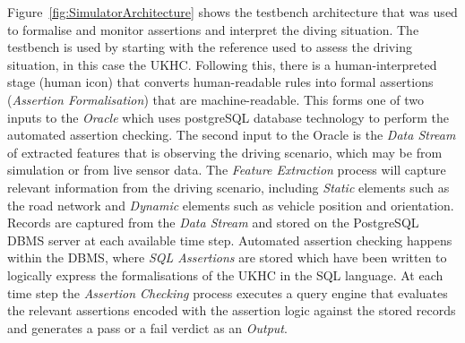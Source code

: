 Figure~\ref{fig:SimulatorArchitecture} shows the testbench architecture that was used to formalise and monitor assertions and interpret the diving situation. The testbench is used by starting with the reference used to assess the driving situation, in this case the UKHC. Following this, there is a human-interpreted stage (human icon) that converts human-readable rules into formal assertions (\emph{Assertion Formalisation}) that are machine-readable. This forms one of two inputs to the \emph{Oracle} which uses postgreSQL database technology to perform the automated assertion checking. The second input to the Oracle is the \emph{Data Stream} of extracted features that is observing the driving scenario, which may be from simulation or from live sensor data. The \emph{Feature Extraction} process will capture relevant information from the driving scenario, including \emph{Static} elements such as the road network and \emph{Dynamic} elements such as vehicle position and orientation. Records are captured from the \emph{Data Stream} and stored on the PostgreSQL DBMS server at each available time step.
%
Automated assertion checking happens within the DBMS, where \emph{SQL Assertions} are stored which have been written to logically express the formalisations of the UKHC in the SQL language. At each time step the \emph{Assertion Checking} process executes a query engine that evaluates the relevant assertions encoded with the assertion logic against the stored records and generates a pass or a fail verdict as an \emph{Output}.




